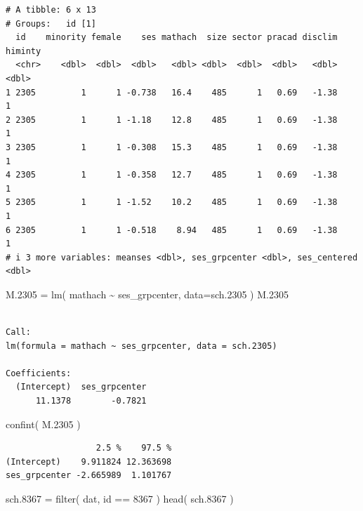\documentclass[
  letterpaper,
  DIV=11,
  numbers=noendperiod]{scrreprt}
\newenvironment{Shaded}{}{}
\newcommand{\AttributeTok}[1]{\textcolor[rgb]{0.49,0.56,0.16}{#1}}
\newcommand{\DecValTok}[1]{\textcolor[rgb]{0.25,0.63,0.44}{#1}}
\newcommand{\FloatTok}[1]{\textcolor[rgb]{0.25,0.63,0.44}{#1}}
\newcommand{\FunctionTok}[1]{\textcolor[rgb]{0.02,0.16,0.49}{#1}}
\newcommand{\NormalTok}[1]{#1}
\newcommand{\OtherTok}[1]{\textcolor[rgb]{0.00,0.44,0.13}{#1}}
\newcommand{\SpecialCharTok}[1]{\textcolor[rgb]{0.25,0.44,0.63}{#1}}
\begin{document}
\begin{verbatim}
# A tibble: 6 x 13
# Groups:   id [1]
  id    minority female    ses mathach  size sector pracad disclim himinty
  <chr>    <dbl>  <dbl>  <dbl>   <dbl> <dbl>  <dbl>  <dbl>   <dbl>   <dbl>
1 2305         1      1 -0.738   16.4    485      1   0.69   -1.38       1
2 2305         1      1 -1.18    12.8    485      1   0.69   -1.38       1
3 2305         1      1 -0.308   15.3    485      1   0.69   -1.38       1
4 2305         1      1 -0.358   12.7    485      1   0.69   -1.38       1
5 2305         1      1 -1.52    10.2    485      1   0.69   -1.38       1
6 2305         1      1 -0.518    8.94   485      1   0.69   -1.38       1
# i 3 more variables: meanses <dbl>, ses_grpcenter <dbl>, ses_centered <dbl>
\end{verbatim}

\begin{Shaded}
\begin{Highlighting}[]
\NormalTok{M}\FloatTok{.2305} \OtherTok{=} \FunctionTok{lm}\NormalTok{( mathach }\SpecialCharTok{\textasciitilde{}}\NormalTok{ ses\_grpcenter, }\AttributeTok{data=}\NormalTok{sch}\FloatTok{.2305}\NormalTok{ )}
\NormalTok{M}\FloatTok{.2305}
\end{Highlighting}
\end{Shaded}

\begin{verbatim}

Call:
lm(formula = mathach ~ ses_grpcenter, data = sch.2305)

Coefficients:
  (Intercept)  ses_grpcenter  
      11.1378        -0.7821  
\end{verbatim}

\begin{Shaded}
\begin{Highlighting}[]
\FunctionTok{confint}\NormalTok{( M}\FloatTok{.2305}\NormalTok{ )}
\end{Highlighting}
\end{Shaded}

\begin{verbatim}
                  2.5 %    97.5 %
(Intercept)    9.911824 12.363698
ses_grpcenter -2.665989  1.101767
\end{verbatim}

\begin{Shaded}
\begin{Highlighting}[]
\NormalTok{sch}\FloatTok{.8367} \OtherTok{=} \FunctionTok{filter}\NormalTok{( dat, id }\SpecialCharTok{==} \DecValTok{8367}\NormalTok{ )}
\FunctionTok{head}\NormalTok{( sch}\FloatTok{.8367}\NormalTok{ )}
\end{Highlighting}
\end{Shaded}
\end{document}
